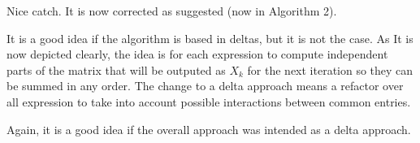 \bigskip

\begin{comment}
	Algorithm 1: simplify $e_{iterate}$ by using the loop init $X_1 = e_{start}$. Then you can
	remove the outer ``if-then-else''.
\end{comment}

\answer Nice catch. It is now corrected as suggested (now in Algorithm 2).
\bigskip

\begin{comment}
	Algorithm 1: $e_{pop}$ can just pop both stacks simultaneously by just removing one row
	from the matrix. The complicated $IdUpTo$ expression is not needed. Just
	compute
	$$
	e_{pop} := - G_{top} * G_{top}^T * X_k + e_{Prev} * V_{top} * e_{V_{top}}^T
	$$
	to pop both stacks. The first summand computes the delta to remove a line
	from the matrix and the second summand reads the pointer for the value
	stack. The pointer for the gate stack will be added in $e_{agg\_(not)\_last}$.
	Note that this is just a delta. Thus $e_{aggregate}$ will need an additional
	$X_{k}$` summand.
\end{comment}

\answer It is a good idea if the algorithm is based in deltas, but it is not the case. As It is now depicted clearly, the idea is for each expression to compute independent parts of the matrix that will be outputed as $X_k$ for the next iteration so they can be summed in any order. The change to a delta approach means a refactor over all expression to take into account possible interactions between common entries.

\bigskip

\begin{comment}
	Algorithm 1: $e_{agg\_prod}$ also looks way to complicated. Why do you need $IdVal$? Just
	manipulate the single matrix entry directly:
	$$
	e_{agg\_prod} := V^T * V_{top} * (V^T * (e_{Prev} * V_{top}) - 1)
	$$
	The $-1$ is to accomodate for the value that is already on the stack.
	No for-loop needed (hidden in the $IdVal$ expression).
\end{comment}

\answer Again, it is a good idea if the overall approach was intended as a delta approach.
\bigskip

\begin{comment}
	Algorithm 1: I find it confusing that in Figure 3 you list the combined effect of two
	of the expressions. The figure should describe each of the expressions on
	its own. Especially as these combinations that you describe are not possible
	in the algorithm. The algorithm combines always three of the expressions.
	Also the Figure is wrong. In the upper two cases, there should be no pointer
	for the gate stack. And in the lower cases there should be an empty value
	stack according to your construction.
\end{comment}

